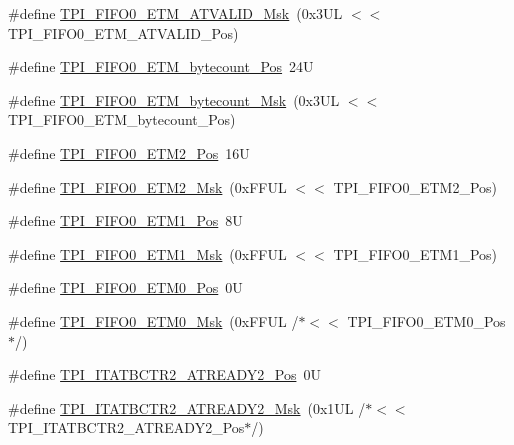 \begin{DoxyCompactItemize}
\item 
\#define \mbox{\hyperlink{group___c_m_s_i_s___t_p_i_ga4f0005dc420b28f2369179a935b9a9d3}{T\+P\+I\+\_\+\+F\+I\+F\+O0\+\_\+\+E\+T\+M\+\_\+\+A\+T\+V\+A\+L\+I\+D\+\_\+\+Msk}}~(0x3\+U\+L $<$$<$ T\+P\+I\+\_\+\+F\+I\+F\+O0\+\_\+\+E\+T\+M\+\_\+\+A\+T\+V\+A\+L\+I\+D\+\_\+\+Pos)
\item 
\#define \mbox{\hyperlink{group___c_m_s_i_s___t_p_i_ga2f738e45386ebf58c4d406f578e7ddaf}{T\+P\+I\+\_\+\+F\+I\+F\+O0\+\_\+\+E\+T\+M\+\_\+bytecount\+\_\+\+Pos}}~24U
\item 
\#define \mbox{\hyperlink{group___c_m_s_i_s___t_p_i_gad2536b3a935361c68453cd068640af92}{T\+P\+I\+\_\+\+F\+I\+F\+O0\+\_\+\+E\+T\+M\+\_\+bytecount\+\_\+\+Msk}}~(0x3\+U\+L $<$$<$ T\+P\+I\+\_\+\+F\+I\+F\+O0\+\_\+\+E\+T\+M\+\_\+bytecount\+\_\+\+Pos)
\item 
\#define \mbox{\hyperlink{group___c_m_s_i_s___t_p_i_ga5f0037cc80c65e86d9e94e5005077a48}{T\+P\+I\+\_\+\+F\+I\+F\+O0\+\_\+\+E\+T\+M2\+\_\+\+Pos}}~16U
\item 
\#define \mbox{\hyperlink{group___c_m_s_i_s___t_p_i_gaa82a7b9b99c990fb12eafb3c84b68254}{T\+P\+I\+\_\+\+F\+I\+F\+O0\+\_\+\+E\+T\+M2\+\_\+\+Msk}}~(0x\+F\+F\+U\+L $<$$<$ T\+P\+I\+\_\+\+F\+I\+F\+O0\+\_\+\+E\+T\+M2\+\_\+\+Pos)
\item 
\#define \mbox{\hyperlink{group___c_m_s_i_s___t_p_i_gac5a2ef4b7f811d1f3d81ec919d794413}{T\+P\+I\+\_\+\+F\+I\+F\+O0\+\_\+\+E\+T\+M1\+\_\+\+Pos}}~8U
\item 
\#define \mbox{\hyperlink{group___c_m_s_i_s___t_p_i_gaad9c1a6ed34a70905005a0cc14d5f01b}{T\+P\+I\+\_\+\+F\+I\+F\+O0\+\_\+\+E\+T\+M1\+\_\+\+Msk}}~(0x\+F\+F\+U\+L $<$$<$ T\+P\+I\+\_\+\+F\+I\+F\+O0\+\_\+\+E\+T\+M1\+\_\+\+Pos)
\item 
\#define \mbox{\hyperlink{group___c_m_s_i_s___t_p_i_ga48783ce3c695d8c06b1352a526110a87}{T\+P\+I\+\_\+\+F\+I\+F\+O0\+\_\+\+E\+T\+M0\+\_\+\+Pos}}~0U
\item 
\#define \mbox{\hyperlink{group___c_m_s_i_s___t_p_i_gaf924f7d1662f3f6c1da12052390cb118}{T\+P\+I\+\_\+\+F\+I\+F\+O0\+\_\+\+E\+T\+M0\+\_\+\+Msk}}~(0x\+F\+F\+U\+L /$\ast$$<$$<$ T\+P\+I\+\_\+\+F\+I\+F\+O0\+\_\+\+E\+T\+M0\+\_\+\+Pos$\ast$/)
\item 
\#define \mbox{\hyperlink{group___c_m_s_i_s___t_p_i_ga36b77b6a6a9808dec534802232ffcaa4}{T\+P\+I\+\_\+\+I\+T\+A\+T\+B\+C\+T\+R2\+\_\+\+A\+T\+R\+E\+A\+D\+Y2\+\_\+\+Pos}}~0U
\item 
\#define \mbox{\hyperlink{group___c_m_s_i_s___t_p_i_gaef520d45da3808f8ffde92b915cd6c7c}{T\+P\+I\+\_\+\+I\+T\+A\+T\+B\+C\+T\+R2\+\_\+\+A\+T\+R\+E\+A\+D\+Y2\+\_\+\+Msk}}~(0x1\+U\+L /$\ast$$<$$<$ T\+P\+I\+\_\+\+I\+T\+A\+T\+B\+C\+T\+R2\+\_\+\+A\+T\+R\+E\+A\+D\+Y2\+\_\+\+Pos$\ast$/)

\end{DoxyCompactItemize}
